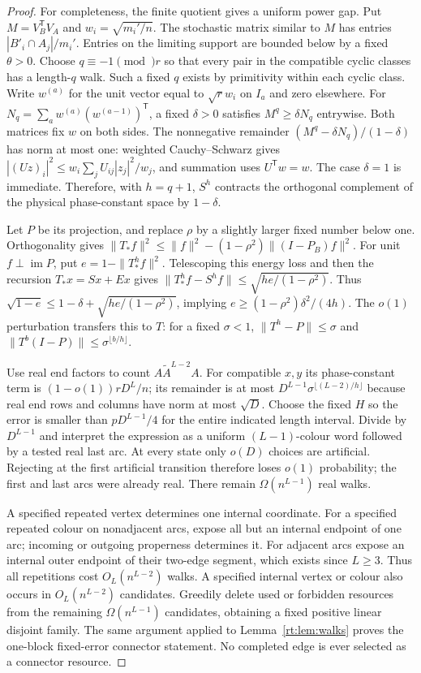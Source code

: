 \begin{proof}
For completeness, the finite quotient gives a uniform power gap.
Put $M=V_B^{\mathsf{T}}V_A$ and $w_i=\sqrt{m_i'/n}$. The stochastic matrix similar to $M$ has entries $|B'_i\cap{}A_j|/m_i'$. Entries on the limiting support are bounded below by a fixed $\theta>0$. Choose $q\equiv-1\pmod{}r$ so that every pair in the compatible cyclic classes has a length-$q$ walk. Such a fixed $q$ exists by primitivity within each cyclic class. Write $w^{(a)}$ for the unit vector equal to $\sqrt{r}w_i$ on $I_a$ and zero elsewhere. For $N_q=\sum_aw^{(a)}(w^{(a-1)})^{\mathsf{T}}$, a fixed $\delta>0$ satisfies $M^q\ge\delta{}N_q$ entrywise. Both matrices fix $w$ on both sides. The nonnegative remainder $(M^q-\delta{}N_q)/(1-\delta)$ has norm at most one: weighted Cauchy--Schwarz gives $|(Uz)_i|^2\le{}w_i\sum_jU_{ij}|z_j|^2/w_j$, and summation uses $U^{\mathsf{T}}w=w$. The case $\delta=1$ is immediate. Therefore, with $h=q+1$, $S^h$ contracts the orthogonal complement of the physical phase-constant space by $1-\delta$.

Let $P$ be its projection, and replace $\rho$ by a slightly larger fixed number below one. Orthogonality gives $\|T_*f\|^2\le\|f\|^2-(1-\rho^2)\|(I-P_B)f\|^2$. For unit $f\perp\operatorname{im}P$, put $e=1-\|T_*^hf\|^2$. Telescoping this energy loss and then the recursion $T_*x=Sx+Ex$ gives $\|T_*^hf-S^hf\|\le\sqrt{he/(1-\rho^2)}$. Thus $\sqrt{1-e}\le1-\delta+\sqrt{he/(1-\rho^2)}$, implying $e\ge(1-\rho^2)\delta^2/(4h)$. The $o(1)$ perturbation transfers this to $T$: for a fixed $\sigma<1$, $\|T^h-P\|\le\sigma$ and $\|T^b(I-P)\|\le\sigma^{\lfloor{}b/h\rfloor}$.

Use real end factors to count $A\widetilde{A}^{L-2}A$. For compatible $x,y$ its phase-constant term is $(1-o(1))rD^L/n$; its remainder is at most $D^{L-1}\sigma^{\lfloor(L-2)/h\rfloor}$ because real end rows and columns have norm at most $\sqrt{D}$. Choose the fixed $H$ so the error is smaller than $pD^{L-1}/4$ for the entire indicated length interval. Divide by $D^{L-1}$ and interpret the expression as a uniform $(L-1)$-colour word followed by a tested real last arc. At every state only $o(D)$ choices are artificial. Rejecting at the first artificial transition therefore loses $o(1)$ probability; the first and last arcs were already real. There remain $\Omega(n^{L-1})$ real walks.

A specified repeated vertex determines one internal coordinate.
For a specified repeated colour on nonadjacent arcs, expose all but
an internal endpoint of one arc; incoming or outgoing properness
determines it. For adjacent arcs expose an internal outer endpoint
of their two-edge segment, which exists since $L\ge3$. Thus all repetitions cost $O_L(n^{L-2})$ walks. A specified internal vertex or colour also occurs in $O_L(n^{L-2})$ candidates. Greedily delete used or forbidden resources from the remaining $\Omega(n^{L-1})$ candidates, obtaining a fixed positive linear disjoint family.
The same argument applied to Lemma~\ref{rt:lem:walks} proves the
one-block fixed-error connector statement. No completed edge is
ever selected as a connector resource.
\end{proof}

